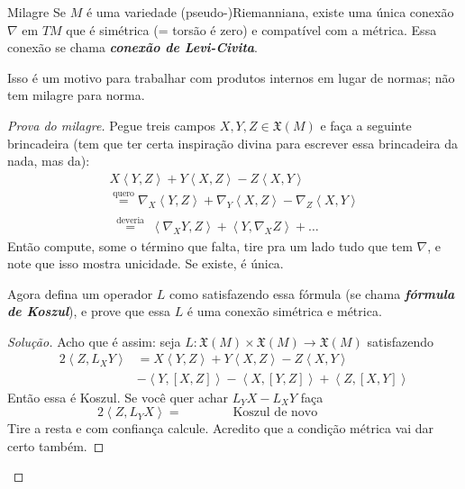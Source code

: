 \begin{thing8}{Milagre}\leavevmode
Se \(M\) é uma variedade (pseudo-)Riemanniana, existe uma única conexão \(\nabla\) em \(TM\) que é simétrica (= torsão é zero) e compatível com a métrica. Essa conexão se chama \textit{\textbf{conexão de Levi-Civita}}.
\end{thing8}

\begin{remark}\leavevmode
Isso é um motivo para trabalhar com produtos internos em lugar de normas; não tem milagre para norma.
\end{remark}

\begin{proof}[Prova do milagre]\leavevmode
Pegue treis campos \(X,Y,Z \in \mathfrak{X}(M)\) e faça a seguinte brincadeira (tem que ter certa inspiração divina para escrever essa brincadeira da nada, mas da):
\begin{gather*}X \left<Y,Z\right>+Y\left<X,Z\right>-Z\left<X,Y\right>\\
\overset{\text{quero}}{=}\nabla_X\left<Y,Z\right>+\nabla_Y\left<X,Z\right>-\nabla_Z\left<X,Y\right>\\
\overset{\substack{\text{deveria}}}{=}\left<\nabla_XY,Z\right>+\left<Y,\nabla_XZ\right> + \ldots\end{gather*}
Então compute, some o término que falta, tire pra um lado tudo que tem \(\nabla\), e note que isso mostra unicidade. Se existe, é única.

\begin{exercise}\leavevmode
Agora defina um operador \(L\) como satisfazendo essa fórmula (se chama \textit{\textbf{fórmula de Koszul}}), e prove que essa \(L\) é uma conexão simétrica e métrica.\end{exercise}
\begin{proof}[Solução]\leavevmode
Acho que é assim: seja \(L:\mathfrak{X}(M) \times \mathfrak{X}(M) \to \mathfrak{X}(M)\) satisfazendo
\begin{align*}
2\left<Z,L_XY\right>&=X\left<Y,Z\right>+Y\left<X,Z\right>-Z\left<X,Y\right>\\
			 &-\left<Y,[X,Z]\right>-\left<X,[Y,Z]\right>+\left<Z,[X,Y]\right>
\end{align*}
Então essa é Koszul. Se você quer achar \(L_YX-L_XY\) faça
\[2\left<Z,L_YX\right>=\qquad \qquad \text{Koszul de novo}\qquad \qquad \;  \]
Tire a resta e com confiança calcule. Acredito que a condição métrica vai dar certo também.
\end{proof}
\end{proof}

